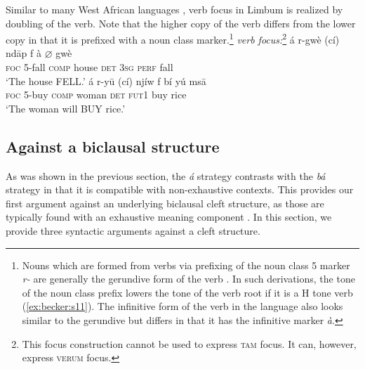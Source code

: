 \documentclass[output=paper,
modfonts
]{langscibook}
\begin{document}
Similar to many West African languages \citep{Koopman1984,Ameka1992,Manfredi1997,Biloa1997,Aboh1998,Aboh2006}, verb focus in Limbum is realized by doubling of the verb. Note that the higher copy of the verb differs from the lower copy in that it is prefixed with a noun class marker.\footnote{Nouns which are formed from verbs via prefixing of the noun class 5 marker \textit{r-} are generally the gerundive form of the verb \citep{Nformi2017}. In such derivations, the tone of the noun class prefix lowers the tone of the verb root if it is a H tone verb (\ref{ex:becker:s11}). The infinitive form of the verb in the language also looks similar to the gerundive but differs in that it has the infinitive marker \textit{\`a}.}
\ea \textit{verb focus:}\footnote{This focus construction cannot be used to express \textsc{tam} focus. It can, however, express \textsc{verum} focus.}
\settowidth{}
\ea \label{ex:becker:s10}
\gll \'a {r-gw\`e} (c\'i) nd\=ap f \`a $\varnothing$ {gw\`e}\\  
     \textsc{foc} {\textsc{5}-fall} \textsc{comp} house \textsc{det}  \textsc{3sg} \textsc{perf} {fall}\\ 
\glt `The house FELL.'
\ex \label{ex:becker:s11}
\gll \'a {r-y\=u} (c\'i) nj\'iw f b\'i {y\'u} ms\=a\\  
     \textsc{foc} {\textsc{5}-buy} \textsc{comp} woman \textsc{det} \textsc{fut1} {buy} rice\\ 
\glt `The woman will BUY rice.'
\z \z


\subsection{Against a biclausal structure}
As was shown in the previous section, the \textit{\'a} strategy contrasts with the \textit{b\'a} strategy in that it is compatible with non-exhaustive contexts. This provides our first argument against an underlying biclausal cleft structure, as those are typically found with an exhaustive meaning component \citep{Horn1981,Percus1997}. In this section, we provide three syntactic arguments against a cleft structure. 
\end{document}
